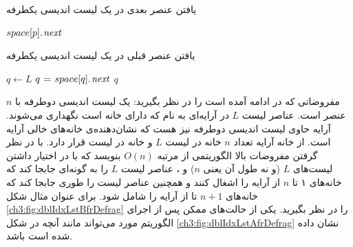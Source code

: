 \begin{algorithm}
\caption{یافتن عنصر بعدی در یک لیست اندیسی یکطرفه}\label{ch3:alg:nxtIdxLst}
\begin{latin}
\begin{algorithmic}[1]
    \State    \Return    $space[p].\hspace*{1pt}\mathit{next}$
\EndFunction
\end{algorithmic}
\end{latin}
\end{algorithm}

\begin{algorithm}
\caption{یافتن عنصر قبلی در یک لیست اندیسی یکطرفه}\label{ch3:alg:prevIdxLst}
\begin{latin}
\begin{algorithmic}[1]
        \State    $q \gets L$
            \State    $q \mathrel{\hspace{1pt}=\hspace{1pt}} space[q].\hspace*{1pt}\mathit{next}$
        \EndWhile
        \State    \Return    $q$
    \Else
        \State    \Return    {}
    \EndIf
\EndFunction
\end{algorithmic}
\end{latin}
\end{algorithm}

 مفروضاتی که در ادامه آمده است را  در نظر بگیرید:
 یک لیست اندیسی دوطرفه با {$n$} عنصر است.
 عناصر لیست {$L$} در آرایه‌ای به نام {} که دارای {} خانه است نگهداری می‌شوند.
 آرایه {} حاوی لیست اندیسی دوطرفه {} نیز هست که نشان‌دهنده‌ی خانه‌های خالی آرایه {} است.
 از {} خانه آرایه {} تعداد {$n$} خانه در لیست {$L$} و {} خانه در لیست {} قرار دارد.
با در نظر گرفتن مفروضات بالا الگوریتمی از مرتبه {$O(n)$} بنویسد که با در اختیار داشتن لیست‌‌های {$L$} (و نه طول آن یعنی {$n$}) و {}، عناصر لیست {$L$} را به گونه‌ای جابجا کند که خانه‌های ۱ تا {$n$} از آرایه {} را اشغال کنند و همچنین عناصر لیست {} را طوری جابجا کند که خانه‌های {$n+1$} تا {} از آرایه {} را شامل شود. برای عنوان مثال شکل {\eqref{ch3:fig:dblIdxLstBfrDefrag}} را در نظر بگیرید. یکی از حالت‌های ممکن پس از اجرای الگوریتم مورد می‌تواند مانند آنچه در شکل {\eqref{ch3:fig:dblIdxLstAfrDefrag}} نشان داده شده است باشد.

